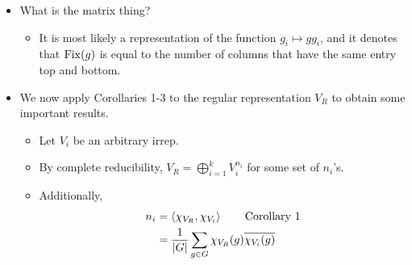 \documentclass[../notes.tex]{subfiles}
\begin{document}
\begin{itemize}
\begin{equation*}
\begin{cases}
            0 & g\neq e\\
            |G| & g=e
        \end{cases}
    \end{equation*}
    \begin{proof}
        We can compute its character $\chi_{V_R}$ by considering the corresponding permutation matrices. Indeed, the action $\chi_{V_R}(g)$ of this character on $g$ is equal to the number of 1's on the diagonal in the permutation matrix, which is equal to the number of fixed points of the permutation, i.e., the number of $i$'s such that $gg_i=g_i$. But in a group, $gg_i=g_i$ iff $g=e$, so this number of fixed points is
        \begin{equation*}
            \chi_{V_R}(g) = \Fix(g)
            =
            \begin{pmatrix}
                g_1 & \cdots & g_n\\
                gg_1 & \cdots & gg_n\\
            \end{pmatrix}
            =
            \begin{cases}
                0 & g\neq e\\
                |G| & g=e
            \end{cases}
        \end{equation*}
        as desired.
    \end{proof}
    \item What is the matrix thing?
    \begin{itemize}
        \item It is most likely a representation of the function $g_i\mapsto gg_i$, and it denotes that $\operatorname{Fix}(g)$ is equal to the number of columns that have the same entry top and bottom.
    \end{itemize}
    \item We now apply Corollaries 1-3 to the regular representation $V_R$ to obtain some important results.
    \begin{itemize}
        \item Let $V_i$ be an arbitrary irrep.
        \item By complete reducibility, $V_R=\bigoplus_{i=1}^kV_i^{n_i}$ for some set of $n_i$'s.
        \item Additionally,
        \begin{align*}
            n_i &= \inp{\chi_{V_R},\chi_{V_i}}\tag*{Corollary 1}\\
            &= \frac{1}{|G|}\sum_{g\in G}\chi_{V_R}(g)\overline{\chi_{V_i}(g)}\\

\end{align*}
\end{itemize}
\end{itemize}
\end{document}
